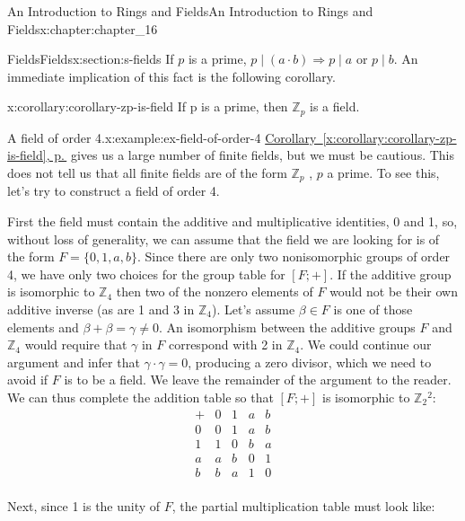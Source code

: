 \documentclass[twoside,10pt,]{book}
\newcommand{\xreffont}{\relax}
\numberwithin{equation}{section}
\begin{document}
\begin{chapterptx}{An Introduction to Rings and Fields}{}{An Introduction to Rings and Fields}{}{}{x:chapter:chapter_16}
\begin{sectionptx}{Fields}{}{Fields}{}{}{x:section:s-fields}
If \(p\) is a prime, \(p\mid (a\cdot b) \Rightarrow p\mid a \textrm{ or } p\mid b\).  An immediate implication of this fact is the following corollary.%
\begin{corollary}{}{}{x:corollary:corollary-zp-is-field}%
If p is a prime, then \(\mathbb{Z}_p\) is a field.%
\end{corollary}
\begin{example}{A field of order 4.}{x:example:ex-field-of-order-4}%
\hyperref[x:corollary:corollary-zp-is-field]{Corollary~{\xreffont\ref{x:corollary:corollary-zp-is-field}}, p.\,\pageref{x:corollary:corollary-zp-is-field}} gives us a large number of finite fields, but we must be cautious. This  does not tell us that all finite fields are of the form \(\mathbb{Z}_p\) , \(p\) a prime. To see this, let's try to construct a field of order 4.%
\par
First the field must contain the additive and multiplicative identities, 0 and 1, so, without loss of generality, we can assume that the field we are looking for is of the form \(F = \{0, 1, a, b\}\).  Since there are only two nonisomorphic groups of order 4, we have only two choices for the group table for \([F; +]\).   If the additive group is isomorphic to \(\mathbb{Z}_4\) then two of the nonzero elements of \(F\) would not be their own additive inverse (as are 1 and 3 in \(\mathbb{Z}_4\)).   Let's assume \(\beta \in F\) is one of those elements and \(\beta +\beta =\gamma \neq 0\).  An isomorphism between the additive groups \(F\) and  \(\mathbb{Z}_4\) would require that \(\gamma\) in \(F\)  correspond with 2 in  \(\mathbb{Z}_4\).  We could continue our argument and infer that \(\gamma \cdot \gamma =0\), producing a zero divisor, which we need to avoid if \(F\) is to be a field.   We leave the remainder of the argument to the reader.   We can thus complete the addition table so that \([F;+]\) is isomorphic to \(\mathbb{Z}_2{}^2\):%
\begin{equation*}
\begin{array}{c|cccc}
+ & 0 & 1 & a & b \\
\hline
0 & 0 & 1 & a & b \\
1 & 1 & 0 & b & a \\
a & a & b & 0 & 1 \\
b & b & a & 1 & 0 \\
\end{array}
\end{equation*}
%
\par
Next, since 1 is the unity of \(F\), the partial multiplication table must look like:%

\end{example}
\end{sectionptx}
\end{chapterptx}
\end{document}
